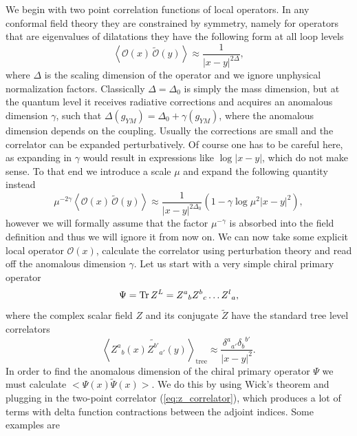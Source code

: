 We begin with two point correlation functions of local operators.
In any conformal field theory they are constrained by symmetry, namely for operators that are eigenvalues of dilatations they have the following form at all loop levels
\begin{equation}
	\left< \mathcal{O}(x) \, \tilde{\mathcal{O}}(y) \right> \approx \frac{1}{|x-y|^{2\Delta}},
\end{equation}
where $\Delta$ is the scaling dimension of the operator and we ignore unphysical normalization factors. 
Classically $\Delta = \Delta_0$ is simply the mass dimension, but at the quantum level it receives radiative corrections and acquires an anomalous dimension $\gamma$, such that $\Delta(g_{YM}) = \Delta_0 + \gamma(g_{YM})$, where the anomalous dimension depends on the coupling. 
Usually the corrections are small and the correlator can be expanded perturbatively.
Of course one has to be careful here, as expanding in $\gamma$ would result in expressions like $\log|x-y|$, which do not make sense. 
To that end we introduce a scale $\mu$ and expand the following quantity instead 
\begin{equation}
	\mu^{-2\gamma} \left< \mathcal{O}(x) \, \tilde{\mathcal{O}}(y) \right> \approx \frac{1}{|x-y|^{2\Delta_0}} \left(1 - \gamma \log \mu^2 |x-y|^2 \right),
	\label{eq:anomdim_expansion}
\end{equation}
however we will formally assume that the factor $\mu^{-\gamma}$ is absorbed into the field definition and thus we will ignore it from now on. We can now take some explicit local operator $\mathcal{O}(x)$, calculate the correlator using perturbation theory and read off the anomalous dimension $\gamma$.
Let us start with a very simple chiral primary operator 
\begin{equation}
	\Psi = \mathrm{Tr} \, Z^L  = {Z^a}_b {Z^b}_c \dots {Z^l}_a,
	\label{eq:primary_op}
\end{equation}
where the complex scalar field $Z$ and its conjugate $\tilde{Z}$ have the standard tree level correlators
\begin{equation}
	\left< {Z^a}_b(x) {{\tilde{Z^{b'}}}}_{a'}(y) \right>_{\mathrm{tree}} \approx \frac{{\delta^a}_{a'} {\delta_b}^{b'}}{|x-y|^{2}}.
	\label{eq:z_correlator}
\end{equation}  
In order to find the anomalous dimension of the chiral primary operator $\Psi$ we must calculate $<\Psi(x) \tilde{\Psi}(x)>$. We do this by using Wick's theorem and plugging in the two-point correlator (\ref{eq:z_correlator}), which produces a lot of terms with delta function contractions between the adjoint indices. Some examples are
